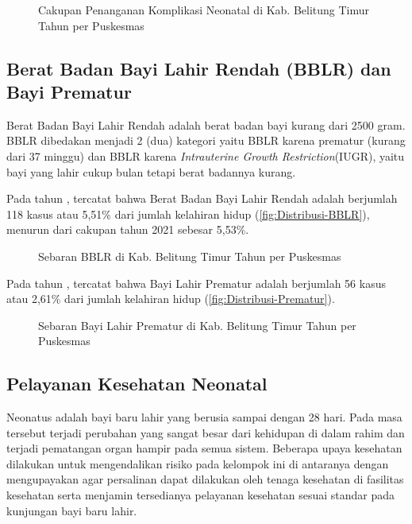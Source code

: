 \begin{figure}[H]
    \centering
    \caption{Cakupan Penanganan Komplikasi Neonatal di Kab. Belitung Timur Tahun \tP per Puskesmas}
    \label{fig:Pelayanan-Komplikasi-Neonatal}
\end{figure}


\subsection{Berat Badan Bayi Lahir Rendah (BBLR) dan Bayi Prematur}
Berat Badan Bayi Lahir Rendah adalah berat badan bayi kurang dari
2500 gram. BBLR dibedakan menjadi 2 (dua) kategori yaitu BBLR karena
prematur (kurang dari 37 minggu) dan BBLR karena \emph{Intrauterine Growth Restriction}(IUGR), yaitu bayi yang lahir cukup bulan tetapi berat badannya kurang.

Pada tahun \tP, tercatat bahwa Berat Badan Bayi Lahir Rendah adalah berjumlah
118 kasus atau 5,51\% dari jumlah kelahiran hidup (\autoref{fig:Distribusi-BBLR}), menurun dari cakupan tahun 2021 sebesar 5,53\%.

\begin{figure}[H]
  \centering
  \caption{Sebaran BBLR di Kab. Belitung Timur Tahun \tP per Puskesmas}
  \label{fig:Distribusi-BBLR}
\end{figure}

Pada tahun \tP, tercatat bahwa Bayi Lahir Prematur adalah berjumlah
56 kasus atau 2,61\% dari jumlah kelahiran hidup (\autoref{fig:Distribusi-Prematur}).

\begin{figure}[H]
	\centering
	\caption{Sebaran Bayi Lahir Prematur di Kab. Belitung Timur Tahun \tP per Puskesmas}
	\label{fig:Distribusi-Prematur}
\end{figure}

\subsection{Pelayanan Kesehatan Neonatal}
Neonatus adalah bayi baru lahir yang berusia sampai dengan 28 hari.
Pada masa tersebut terjadi perubahan yang sangat besar dari kehidupan
di dalam rahim dan terjadi pematangan organ hampir pada semua sistem.
Beberapa upaya kesehatan dilakukan untuk mengendalikan risiko pada
kelompok ini di antaranya dengan mengupayakan agar persalinan dapat
dilakukan oleh tenaga kesehatan di fasilitas kesehatan serta menjamin
tersedianya pelayanan kesehatan sesuai standar pada kunjungan bayi
baru lahir.

